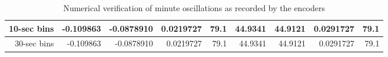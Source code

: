 {\begin{table}[htbp]
\begin{tabular}{|r|r|r|r|r|r|r|r|r|}
10-sec bins            & -0.109863                      & -0.0878910                     & 0.0219727                        & 79.1                                & 44.9341                        & 44.9121                        & 0.0291727                        & 79.1                                \\ \hline
30-sec bins            & -0.109863                      & -0.0878910                     & 0.0219727                        & 79.1                                & 44.9341                        & 44.9121                        & 0.0291727                        & 79.1                                \\ \hline
\end{tabular}
\caption{Numerical verification of minute oscillations as recorded by the encoders}
\label{tab:encoders}
\end{table}

}
